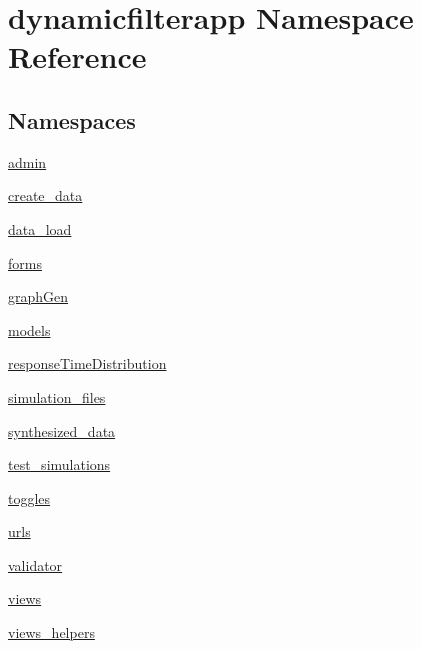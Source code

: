 \hypertarget{namespacedynamicfilterapp}{}\section{dynamicfilterapp Namespace Reference}
\label{namespacedynamicfilterapp}
\subsection*{Namespaces}
\begin{DoxyCompactItemize}
\item 
 \mbox{\hyperlink{namespacedynamicfilterapp_1_1admin}{admin}}
\item 
 \mbox{\hyperlink{namespacedynamicfilterapp_1_1create__data}{create\+\_\+data}}
\item 
 \mbox{\hyperlink{namespacedynamicfilterapp_1_1data__load}{data\+\_\+load}}
\item 
 \mbox{\hyperlink{namespacedynamicfilterapp_1_1forms}{forms}}
\item 
 \mbox{\hyperlink{namespacedynamicfilterapp_1_1graph_gen}{graph\+Gen}}
\item 
 \mbox{\hyperlink{namespacedynamicfilterapp_1_1models}{models}}
\item 
 \mbox{\hyperlink{namespacedynamicfilterapp_1_1response_time_distribution}{response\+Time\+Distribution}}
\item 
 \mbox{\hyperlink{namespacedynamicfilterapp_1_1simulation__files}{simulation\+\_\+files}}
\item 
 \mbox{\hyperlink{namespacedynamicfilterapp_1_1synthesized__data}{synthesized\+\_\+data}}
\item 
 \mbox{\hyperlink{namespacedynamicfilterapp_1_1test__simulations}{test\+\_\+simulations}}
\item 
 \mbox{\hyperlink{namespacedynamicfilterapp_1_1toggles}{toggles}}
\item 
 \mbox{\hyperlink{namespacedynamicfilterapp_1_1urls}{urls}}
\item 
 \mbox{\hyperlink{namespacedynamicfilterapp_1_1validator}{validator}}
\item 
 \mbox{\hyperlink{namespacedynamicfilterapp_1_1views}{views}}
\item 
 \mbox{\hyperlink{namespacedynamicfilterapp_1_1views__helpers}{views\+\_\+helpers}}
\end{DoxyCompactItemize}
